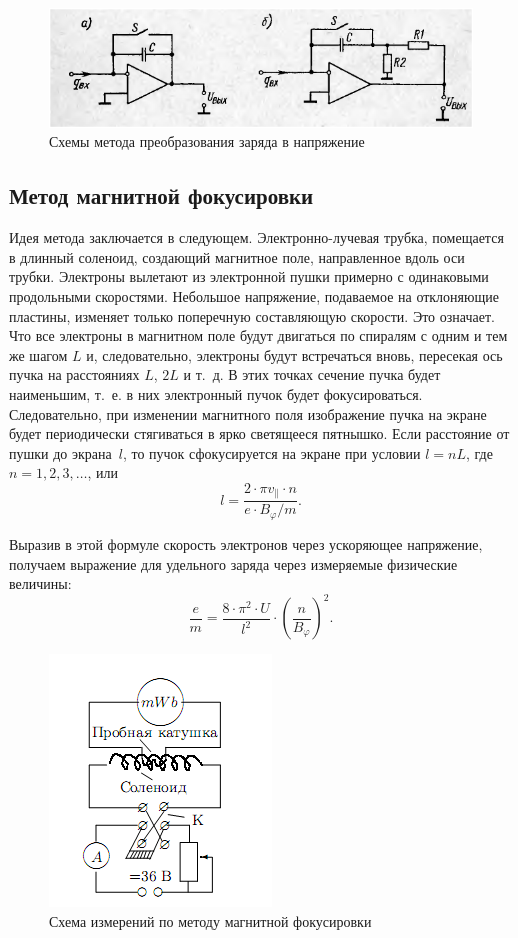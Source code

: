 \documentclass[pscyr]{hedwork}
\begin{document}
  \begin{figure}[ht]
    \center
    \includegraphics{sl_6_1}
    \caption{Схемы метода преобразования заряда в напряжение}
    \label{picQ2U}
  \end{figure}

  \subsection{Метод магнитной фокусировки}

  Идея метода заключается в следующем. Электронно-лучевая трубка, помещается в
  длинный соленоид, создающий магнитное поле, направленное вдоль оси трубки.
  Электроны вылетают из электронной пушки примерно с одинаковыми продольными
  скоростями. Небольшое напряжение, подаваемое на отклоняющие пластины, изменяет
  только поперечную составляющую скорости. Это означает. Что все электроны в
  магнитном поле будут двигаться по спиралям с одним и тем же шагом \( L \) и,
  следовательно, электроны будут встречаться вновь, пересекая ось пучка на
  расстояниях \( L \), \( 2L \) и т.~д. В этих точках сечение пучка будет
  наименьшим, т.~е. в них электронный пучок будет фокусироваться. Следовательно,
  при изменении магнитного поля изображение пучка на экране будет периодически
  стягиваться в ярко светящееся пятнышко. Если расстояние от пушки до
  экрана~\( l \), то пучок сфокусируется на экране при условии \( l = nL \),
  где \( n = 1, 2, 3, \ldots \), или
  \[
    l = \frac{2\cdot\pi v_\|\cdot n}{e\cdot B_\varphi/m}.
  \]

  Выразив в этой формуле скорость электронов через ускоряющее напряжение,
  получаем выражение для удельного заряда через измеряемые физические величины:
  \[
    \frac{e}{m} = \frac{8\cdot\pi^2\cdot U}{l^2}\cdot
      \left( \frac{n}{B_\varphi} \right)^2.
  \]

  \begin{figure}[ht]
    \center
    \includegraphics{sl_7_1}
    \caption{Схема измерений по методу магнитной фокусировки}
    \label{picMagFoc}
  \end{figure}
\end{document}
